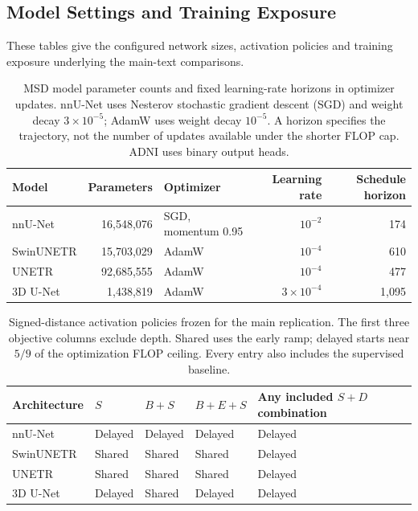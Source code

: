 \documentclass[12pt,a4paper]{article}
\begin{document}
\subsection{Model Settings and Training Exposure}\label{sec:implementation-tables}
These tables give the configured network sizes, activation policies and
training exposure underlying the main-text comparisons.

\begin{table}[htbp]
\centering\small{}
\begin{tabular}{@{}P{2.5cm}rP{3.0cm}rr@{}}
\hline
Model & Parameters & Optimizer & Learning rate & Schedule horizon \\
\hline
nnU-Net & 16,548,076 & SGD, momentum 0.95 & $10^{-2}$ & 174 \\
SwinUNETR & 15,703,029 & AdamW & $10^{-4}$ & 610 \\
UNETR & 92,685,555 & AdamW & $10^{-4}$ & 477 \\
3D U-Net & 1,438,819 & AdamW & $3\times10^{-4}$ & 1,095 \\
\hline
\end{tabular}
\caption{MSD model parameter counts and fixed learning-rate horizons in optimizer
updates. nnU-Net uses Nesterov stochastic gradient descent (SGD) and weight decay $3\times10^{-5}$;
AdamW uses weight decay $10^{-5}$. A horizon specifies the trajectory,
not the number of updates available under the shorter FLOP cap. ADNI
uses binary output heads.}
\label{tab:main-model-settings}
\end{table}
\FloatBarrier
\begin{table}[htbp]
\centering
\small
{}
\renewcommand{\arraystretch}{1.2}
\begin{tabular}{@{}P{3.0cm}P{2.0cm}P{2.2cm}P{2.7cm}P{3.8cm}@{}}
\hline
Architecture & $S$ & $B+S$ & $B+E+S$ & Any included $S+D$ combination \\
\hline
nnU-Net & Delayed & Delayed & Delayed & Delayed \\
SwinUNETR & Shared & Shared & Shared & Delayed \\
UNETR & Shared & Shared & Shared & Delayed \\
3D U-Net & Delayed & Shared & Delayed & Delayed \\
\hline
\end{tabular}
\caption{Signed-distance activation policies frozen for the main
replication. The first three objective columns exclude depth. Shared
uses the early ramp; delayed starts near $5/9$ of the optimization
FLOP ceiling. Every entry also includes the supervised baseline.}
\label{tab:sdf-activation-policies}
\end{table}
\end{document}

